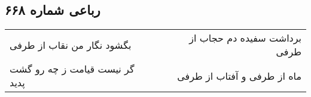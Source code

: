 \begin{center}
\section*{رباعی شماره ۶۶۸}
\label{sec:sh668}
\begin{longtable}{l p{0.5cm} r}
بگشود نگار من نقاب از طرفی
&&
برداشت سفیده دم حجاب از طرفی
\\
گر نیست قیامت ز چه رو گشت پدید
&&
ماه از طرفی و آفتاب از طرفی
\\
\end{longtable}
\end{center}
